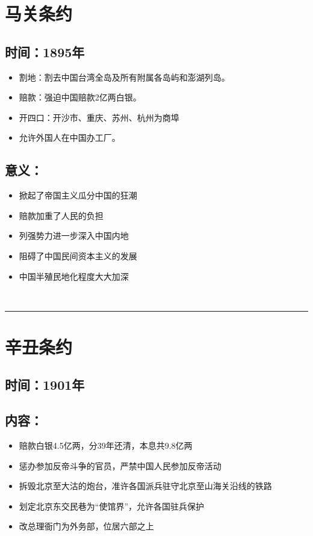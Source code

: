 \documentclass{article}
\begin{document}
\section*{马关条约}
\subsection*{时间：1895年}
\begin{itemize}
    \item 割地：割去中国台湾全岛及所有附属各岛屿和澎湖列岛。
    \item 赔款：强迫中国赔款2亿两白银。
    \item 开四口：开沙市、重庆、苏州、杭州为商埠
    \item 允许外国人在中国办工厂。
\end{itemize}
\subsection*{意义：}
\begin{itemize}
\item 掀起了帝国主义瓜分中国的狂潮
\item 赔款加重了人民的负担
\item 列强势力进一步深入中国内地
\item 阻碍了中国民间资本主义的发展
\item 中国半殖民地化程度大大加深
\end{itemize}
\ \hrule

\section*{辛丑条约}
\subsection*{时间：1901年}
\subsection*{内容：}
\begin{itemize}
    \item 赔款白银4.5亿两，分39年还清，本息共9.8亿两
    \item 惩办参加反帝斗争的官员，严禁中国人民参加反帝活动
    \item 拆毁北京至大沽的炮台，准许各国派兵驻守北京至山海关沿线的铁路
    \item  划定北京东交民巷为“使馆界”，允许各国驻兵保护
    \item 改总理衙门为外务部，位居六部之上
\end{itemize}
\end{document}
